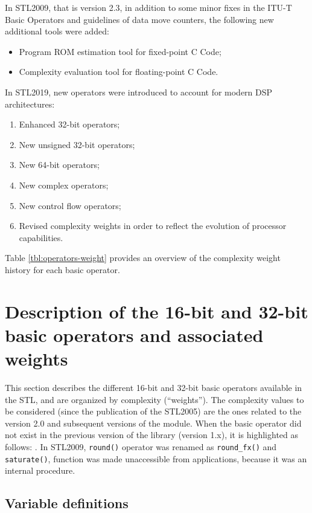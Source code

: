 In STL2009, that is version 2.3, in addition to some minor fixes in the ITU-T Basic Operators and guidelines of data move counters, the following new additional tools were added:
\begin{itemize}
    \item Program ROM estimation tool for fixed-point C Code;
    \item Complexity evaluation tool for floating-point C Code.
\end{itemize}

In STL2019, new operators were introduced to account for modern DSP architectures:
\begin{enumerate}
    \item Enhanced 32-bit operators;
    \item New unsigned 32-bit operators;
    \item New 64-bit operators;
    \item New complex operators;
    \item New control flow operators;
    \item Revised complexity weights in order to reflect the evolution of processor capabilities.
\end{enumerate}

Table \ref{tbl:operators-weight} provides an overview of the complexity weight history for each basic operator.

\section{Description of the 16-bit and 32-bit basic operators and associated weights}

This section describes the different 16-bit and 32-bit basic operators available in the STL, and are organized by complexity (``weights'').
The complexity values to be considered (since the publication of the STL2005) are the ones related to the version 2.0 and subsequent versions of the module.
When the basic operator did not exist in the previous version of the library (version 1.x), it is highlighted as follows:
 . In STL2009, {\tt round()} operator was renamed as {\tt round\_fx()} and {\tt saturate()}, function was made unaccessible from applications, because it was an internal procedure.

\subsection{Variable definitions}

